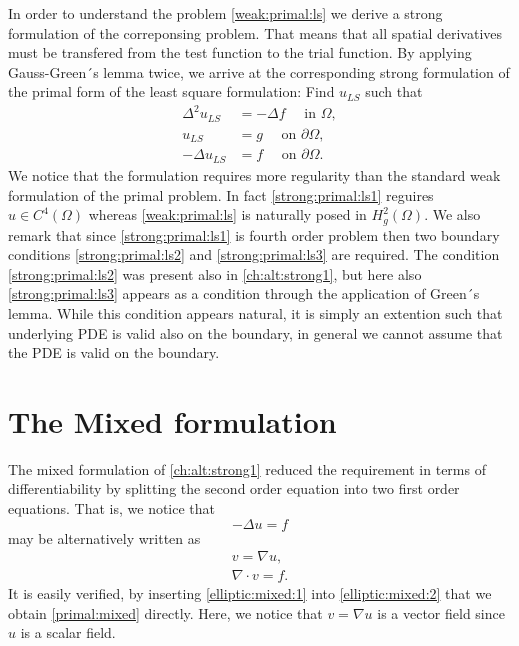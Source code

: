 In order to understand the problem  \eqref{weak:primal:ls} we derive a strong formulation of the correponsing
problem. That means that all spatial derivatives must be transfered from the test function to the trial function. 
By applying Gauss-Green´s lemma twice, we arrive at the corresponding strong formulation
of the primal form of the least square formulation:
Find $u_{LS}$ such that     
\begin{align}
\label{strong:primal:ls1}
\Delta^2 u_{LS} &= -\Delta f \quad \mbox{ in } \Omega, \\ 
\label{strong:primal:ls2}
 u_{LS} &= g \quad \mbox{ on } \partial \Omega,   \\ 
\label{strong:primal:ls3}
 -\Delta u_{LS} &= f \quad \mbox{ on } \partial \Omega .  
\end{align}
We notice that the formulation requires more regularity than the standard weak formulation of the primal problem. In fact 
\eqref{strong:primal:ls1} reguires $u \in C^4(\Omega)$ whereas   
\eqref{weak:primal:ls} is naturally posed in $H^2_g(\Omega)$.  
We also remark that since \eqref{strong:primal:ls1} is fourth order problem then two 
boundary conditions \eqref{strong:primal:ls2} and \eqref{strong:primal:ls3} are required.  
The condition \eqref{strong:primal:ls2} was present also in 
\eqref{ch:alt:strong1}, but here also  \eqref{strong:primal:ls3} appears as a condition through 
the application of Green´s lemma. While this condition appears natural, it is simply an extention
such that underlying PDE is valid also on the boundary, in general we cannot assume that the PDE is 
valid on the boundary.  

\section{The Mixed formulation}

The mixed formulation of \eqref{ch:alt:strong1} reduced the requirement in terms of
differentiability by splitting the second order equation into two first order equations. 
That is, we notice that
\begin{equation} 
\label{primal:mixed}
-\Delta u = f 
\end{equation} 
may be alternatively written as 
\begin{align}
\label{elliptic:mixed:1}
v = \nabla u, \\ 
\label{elliptic:mixed:2}
\nabla \cdot v = f . 
\end{align}
It is easily verified,  by inserting \eqref{elliptic:mixed:1} into \eqref{elliptic:mixed:2} 
that we obtain \eqref{primal:mixed} directly. Here, we notice that $v = \nabla u$ is a vector field since $u$ is a scalar field.  

